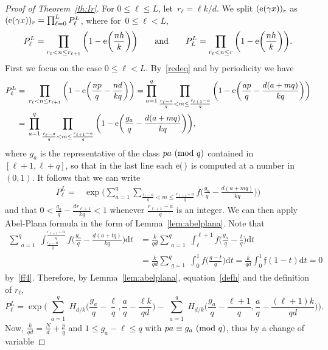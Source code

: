 \documentclass[11pt]{amsart}
\newcommand{\lf}{{\mathfrak f}}
\renewcommand{\mod}[1]{~\pr{\textnormal{mod}~#1}}
\theoremstyle{definition}
\newcommand{\ssum}[1]{\sum_{\substack{#1}}}
\newcommand{\pr}[1]{\mathchoice{\left( #1\right)}{(#1)}{(#1)}{(#1)}}
\newcommand{\e}[1][]{\ifthenelse{\equal{#1}{}}{{\rm e}}{\operatorname{e}\pr{ #1}}}
\newcommand{\df}{\mathrm{d}}
\newcommand{\1}{{\mathbf 1}}
\let\originalleft\left
\let\originalright\right
\renewcommand{\left}{\mathopen{}\mathclose\bgroup\originalleft}
\renewcommand{\right}{\aftergroup\egroup\originalright}
\numberwithin{equation}{section}
\begin{document}
\begin{proof}[Proof of Theorem~\ref{th:Ir}]
  For $0\leq\ell\leq L$, let~$r_\ell  = \ell k/d$. We split $(\e[\gamma x])_r$ as 
  $
  (\e[\gamma x])_r=\prod_{\ell =0}^LP_\ell^L
  $, where for~$0\leq \ell  < L$,  
  $$ P_\ell ^L = \prod_{r_\ell  < n \leq r_{\ell +1}} \bigg(1-\e[\frac{nh}k]\bigg) \qquad \text{and} \qquad P_L^L = \prod_{r_\ell  < n \leq r} \bigg(1-\e[\frac{nh}k]\bigg). 
  $$
  First we focus on the case $0\leq \ell<L$. By~\eqref{redeq} and by periodicity we have
  \begin{align*}
    P_\ell ^L ={}&  \prod_{r_\ell  < n \leq r_{\ell +1} } \bigg(1-\e[\frac{np}q - \frac{nd}{kq}]\bigg) =\prod_{a=1}^{q}\prod_{\frac{r_\ell -a}q < m \leq \frac{r_{\ell +1}-a}q} \bigg(1-\e[\frac{ap}q - \frac{d(a+mq)}{kq}]\bigg) \\
    ={}& \prod_{a=1}^{q}\prod_{\frac{r_\ell -a}q < m \leq \frac{r_{\ell +1}-a}q} \bigg(1-\e[\frac{g_a}q - \frac{d(a+mq)}{kq}]\bigg),
  \end{align*}
  where $g_a$ is the representative of the class $pa\mod q$ contained in $[\ell+1,\ell+q]$, so that in the last line each $\e[\,]$ is computed at a number in $(0,1)$. It follows that we can write
  \begin{align*}
    P_\ell ^L ={}&\exp\bigg(\sum_{a=1}^{q}\sum_{\frac{r_\ell -a}q < m \leq \frac{r_{\ell +1}-a}q} f\bigg(\frac{g_a}q - \frac{d(a+mq)}{kq}\bigg) \bigg)
  \end{align*}
  and that $0<\frac{g_a}q - \frac{dr_{\ell+1}}{kq}<1$ whenever $\frac{r_{\ell +1}-a}q$ is an integer.
  We can then apply Abel-Plana formula in the form of Lemma~\ref{lem:abelplana}.   
  Note that
  \begin{align*}
    \ssum{a=1}^{q} \int_{\frac{r_\ell -a}q}^{\frac{r_{\ell +1}-a}q} f\Big(\frac{g_a}q- \frac{d(a+tq)}{kq}\Big)\df t &= \frac k{qd} \ssum{a=1}^{q} \int_\ell ^{\ell +1} f\Big(\frac{g_a}q-\frac{t}q\Big)\df t \\
    &=\frac k{qd} \ssum{g=1}^{q} \int_0 ^{1} f\Big(\frac{g-t}q\Big)\df t=  \frac k{qd} \int_0 ^{1} \lf(1-t)\df t = 0
  \end{align*}
  by~\eqref{ff4}.  Therefore, by Lemma~\ref{lem:abelplana}, equation~\eqref{defh} and the definition of $r_\ell$,
  $$ P_\ell ^L = \exp\bigg(\ssum{a=1}^{q} H_{d/k}\Big(\frac{g_a}q-\frac\ell q, \frac{a}q - \frac{\ell k}{qd}\Big) - \ssum{a=1}^{q}  H_{d/k}\Big(\frac{g_a}q-\frac{\ell+1}q, \frac{a}q - \frac{(\ell +1)k}{qd}\Big)\bigg). $$
  Now, $\frac{k}{qd}=\frac{N}{d}+\frac{\overline p}q$ and $1\leq g_a-\ell\leq q$ with $pa\equiv g_a\mod q$, thus by a change of variable

\end{proof}
\end{document}
